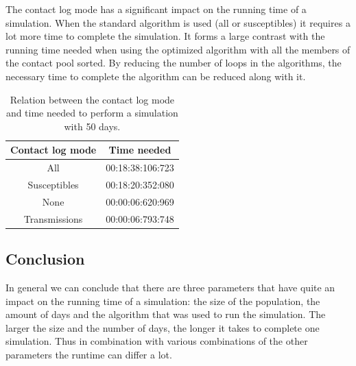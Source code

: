 \documentclass[runningheads]{llncs}
\begin{document}
The contact log mode has a significant impact on the running time of a simulation. When the standard algorithm is used (all or susceptibles) it requires a lot more time to complete the simulation. It forms a large contrast with the running time needed when using the optimized algorithm with all the members of the contact pool sorted. By reducing the number of loops in the algorithms, the necessary time to complete the algorithm can be reduced along with it.
\begin{table}
	\caption{Relation between the contact log mode and time needed to perform a simulation with 50 days.}
\begin{center}
	\begin{tabular}{ | c | c |}
		\hline
		Contact log mode & Time needed \\ \hline
		All & 00:18:38:106:723 \\ \hline
		Susceptibles & 00:18:20:352:080 \\ \hline
		None & 00:00:06:620:969 \\ \hline
		Transmissions & 00:00:06:793:748 \\
		\hline	
	\end{tabular}
\end{center}
\end{table}

\subsection{Conclusion}
In general we can conclude that there are three parameters that have quite an impact on the running time of a simulation: the size of the population, the amount of days and the algorithm that was used to run the simulation. The larger the size and the number of days, the longer it takes to complete one simulation. Thus in combination with various combinations of the other parameters the runtime can differ a lot.
\end{document}
